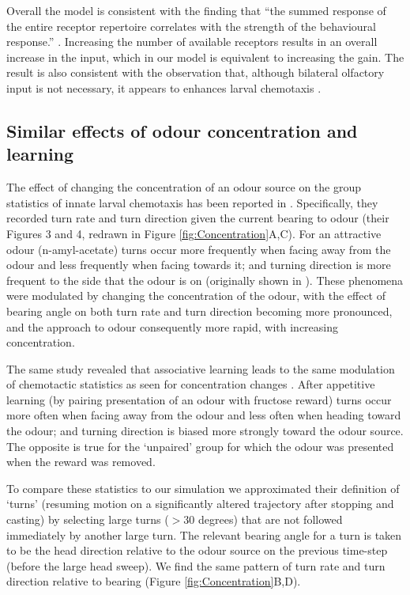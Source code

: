 \documentclass[11pt,a4paper]{article}
\begin{document}
 Overall the model is consistent with the finding that ``the summed response of the entire receptor repertoire correlates with the strength of the behavioural response.” \citep{kreher2008translation}. Increasing the number of available receptors results in an overall increase in the input, which in our model is equivalent to increasing the gain. The result is also consistent with the observation that, although bilateral olfactory input is not necessary, it appears to enhances larval chemotaxis \citep{louis2008bilateral}.


\subsection{Similar effects of odour concentration and learning}
The effect of changing the concentration of an odour source on the group statistics of innate larval chemotaxis has been reported in \citep{schleyer2015learning}. Specifically, they recorded turn rate and turn direction given the current bearing to odour (their Figures 3 and 4, redrawn in Figure \ref{fig:Concentration}A,C). For an attractive odour (n-amyl-acetate) turns occur more frequently when facing away from the odour and less frequently when facing towards it; and turning direction is more frequent to the side that the odour is on (originally shown in \citet{gomez2011active}). These phenomena were modulated by changing the concentration of the odour, with the effect of bearing angle on both turn rate and turn direction becoming more pronounced, and the approach to odour consequently more rapid, with increasing concentration.

The same \cite{schleyer2015learning} study revealed that associative learning leads to the same modulation of chemotactic statistics as seen for concentration changes \citep[][Figures 3 and 4]{schleyer2015learning}. After appetitive learning (by pairing presentation of an odour with fructose reward) turns occur more often when facing away from the odour and less often when heading toward the odour; and turning direction is biased more strongly toward the odour source. The opposite is true for the ‘unpaired’ group for which the odour was presented when the reward was removed. 


 To compare these statistics to our simulation we approximated their definition of ‘turns’ (resuming motion on a significantly altered trajectory after stopping and casting) by selecting large turns ($>30$ degrees) that are not followed immediately by another large turn. The relevant bearing angle for a turn is taken to be the head direction relative to the odour source on the previous time-step (before the large head sweep). We find the same pattern of turn rate and turn direction relative to bearing (Figure \ref{fig:Concentration}B,D).
\end{document}
